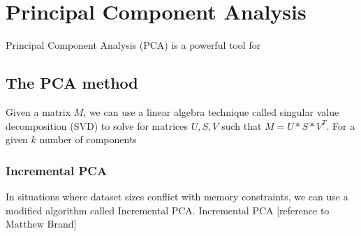 %
\chapter{Principal Component Analysis}
\label{cpt:pca}

Principal Component Analysis (PCA) is a powerful tool for 

\section{The PCA method}

Given a matrix $M$, we can use a linear algebra technique called singular value decomposition (SVD) to solve for matrices $U, S, V$ such that $M = U * S * V^T.$  For a given $k$ number of components

\subsection{Incremental PCA}

In situations where dataset sizes conflict with memory constraints, we can use a modified algorithm called Incremental PCA.  Incremental PCA [reference to Matthew Brand]